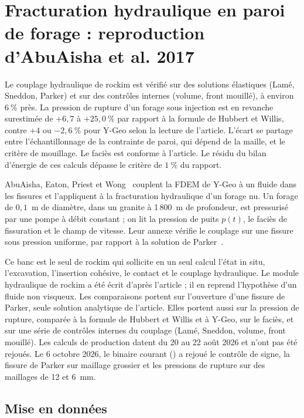 \section{Fracturation hydraulique en paroi de forage : reproduction d'AbuAisha et al. 2017}
\label{sec-abuaisha}

Le couplage hydraulique de rockim est vérifié sur des solutions élastiques (Lamé, Sneddon, Parker) et sur des contrôles internes (volume, front mouillé), à environ $6~\%$ près. La pression de rupture d'un forage sous injection est en revanche surestimée de $+6{,}7$ à $+25{,}0~\%$ par rapport à la formule de Hubbert et Willis, contre $+4$ ou $-2{,}6~\%$ pour Y-Geo selon la lecture de l'article. L'écart se partage entre l'échantillonnage de la contrainte de paroi, qui dépend de la maille, et le critère de mouillage. Le faciès est conforme à l'article. Le résidu du bilan d'énergie de ces calculs dépasse le critère de $1~\%$ du rapport.

AbuAisha, Eaton, Priest et Wong~\cite{abuaisha2017hm} couplent la FDEM de Y-Geo à un fluide dans les fissures et l'appliquent à la fracturation hydraulique d'un forage nu. Un forage de $0{,}1$~m de diamètre, dans un granite à 1\,800~m de profondeur, est pressurisé par une pompe à débit constant ; on lit la pression de puits $p(t)$, le faciès de fissuration et le champ de vitesse. Leur annexe vérifie le couplage sur une fissure sous pression uniforme, par rapport à la solution de Parker~\cite{parker1981}.

Ce banc est le seul de rockim qui sollicite en un seul calcul l'état in situ, l'excavation, l'insertion cohésive, le contact et le couplage hydraulique. Le module hydraulique de rockim a été écrit d'après l'article ; il en reprend l'hypothèse d'un fluide non visqueux. Les comparaisons portent sur l'ouverture d'une fissure de Parker, seule solution analytique de l'article. Elles portent aussi sur la pression de rupture, comparée à la formule de Hubbert et Willis et à Y-Geo, sur le faciès, et sur une série de contrôles internes du couplage (Lamé, Sneddon, volume, front mouillé). Les calculs de production datent du 20 au 22 août 2026 et n'ont pas été rejoués. Le 6 octobre 2026, le binaire courant () a rejoué le contrôle de signe, la fissure de Parker sur maillage grossier et les pressions de rupture sur des maillages de 12 et 6~mm.

\subsection{Mise en données}

